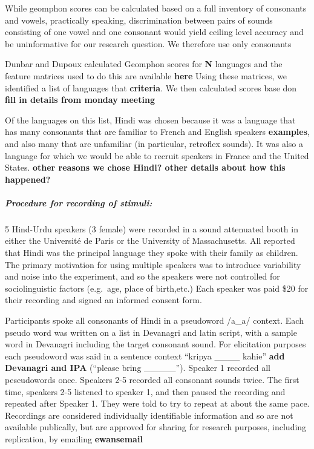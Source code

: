 \documentclass[]{article}
\let\oldsubparagraph\subparagraph
\renewcommand{\subparagraph}[1]{\oldsubparagraph{#1}\mbox{}}
\begin{document}
While geomphon scores can be calculated based on a full inventory of
consonants and vowels, practically speaking, discrimination between
pairs of sounds consisting of one vowel and one consonant would yield
ceiling level accuracy and be uninformative for our research question.
We therefore use only consonants

Dunbar and Dupoux calculated Geomphon scores for \textbf{N} languages
and the feature matrices used to do this are available \textbf{here}
Using these matrices, we identified a list of languages that
\textbf{criteria}. We then calculated scores base don \textbf{fill in
details from monday meeting}

Of the languages on this list, Hindi was chosen because it was a
language that has many consonants that are familiar to French and
English speakers \textbf{examples}, and also many that are unfamiliar
(in particular, retroflex sounds). It was also a language for which we
would be able to recruit speakers in France and the United States.
\textbf{other reasons we chose Hindi? other details about how this
happened?}

\hypertarget{procedure-for-recording-of-stimuli}{%
\subparagraph{Procedure for recording of
stimuli:}\label{procedure-for-recording-of-stimuli}}

5 Hind-Urdu speakers (3 female) were recorded in a sound attenuated
booth in either the Université de Paris or the University of
Massachusetts. All reported that Hindi was the principal language they
spoke with their family as children. The primary motivation for using
multiple speakers was to introduce variability and noise into the
experiment, and so the speakers were not controlled for sociolinguistic
factors (e.g.~age, place of birth,etc.) Each speaker was paid \$20 for
their recording and signed an informed consent form.

Participants spoke all consonants of Hindi in a pseudoword /a\_a/
context. Each pseudo word was written on a list in Devanagri and latin
script, with a sample word in Devanagri including the target consonant
sound. For elicitation purposes each pseudoword was said in a sentence
context ``kripya \_\_\_\_ kahie'' \textbf{add Devanagri and IPA}
(``please bring \_\_\_\_\_''). Speaker 1 recorded all peseudowords once.
Speakers 2-5 recorded all consonant sounds twice. The first time,
speakers 2-5 listened to speaker 1, and then paused the recording and
repeated after Speaker 1. They were told to try to repeat at about the
same pace. Recordings are considered individually identifiable
information and so are not available publically, but are approved for
sharing for research purposes, including replication, by emailing
\textbf{ewansemail}
\end{document}
